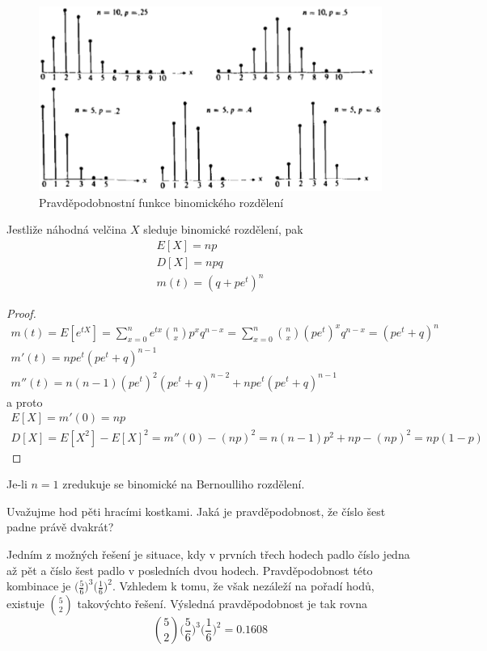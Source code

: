 \begin{figure}[htp]
\centering
\includegraphics[scale = 0.5]{pictures/binomial_distribution.eps}
\caption{Pravděpodobnostní funkce binomického rozdělení}
\label{binomial_distribution}
\end{figure} 

\begin{theorem}
Jestliže náhodná velčina $X$ sleduje binomické rozdělení, pak
\begin{gather*}
E[X] = np\\
D[X] = npq\\
m(t) = (q + pe^t)^n
\end{gather*}
\end{theorem}

\begin{proof}
\begin{gather*}
m(t) = E[e^{tX}] = \sum_{x=0}^ne^{tx}\binom{n}{x}p^x q^{n-x}=\sum_{x=0}^n \binom{n}{x}(pe^t)^xq^{n-x} = (pe^t + q)^n\\
m'(t) = npe^t(pe^t + q)^{n-1}\\
m''(t) = n(n-1)(pe^t)^2(pe^t + q)^{n-2} + npe^t(pe^t + q)^{n-1}
\end{gather*}
a proto
\begin{gather*}
E[X] =  m'(0) = np\\
D[X] = E[X^2] - E[X]^2 = m''(0) - (np)^2 = n(n-1)p^2 + np - (np)^2 = np(1-p)
\end{gather*}
\end{proof}
Je-li $n=1$ zredukuje se binomické na Bernoulliho rozdělení.
\begin{example}
Uvažujme hod pěti hracími kostkami. Jaká je pravděpodobnost, že číslo šest padne právě dvakrát?

Jedním z možných řešení je situace, kdy v prvních třech hodech padlo číslo jedna až pět a číslo šest padlo v posledních dvou hodech. Pravděpodobnost této kombinace je $\big(\frac{5}{6}\big)^3\big(\frac{1}{6}\big)^2$. Vzhledem k tomu, že však nezáleží na pořadí hodů, existuje $\binom{5}{2}$ takovýchto řešení. Výsledná pravděpodobnost je tak rovna
\begin{equation*}
\binom{5}{2}\Big(\frac{5}{6}\Big)^3\Big(\frac{1}{6}\Big)^2 = 0.1608
\end{equation*} 
\end{example}

